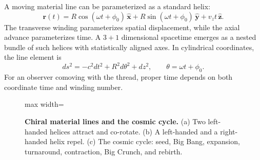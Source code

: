 \documentclass[12pt,a4paper]{article}
\begin{document}
A moving material line can be parameterized as a standard helix:
\begin{equation}
    \mathbf{r}(t) = R\cos(\omega t+\phi_0)\,\hat{\mathbf{x}}
    + R\sin(\omega t+\phi_0)\,\hat{\mathbf{y}}
    + v_z t\,\hat{\mathbf{z}}.
    \label{eq:helix}
\end{equation}
The transverse winding parameterizes spatial displacement, while the axial advance parameterizes time. A $3+1$ dimensional spacetime emerges as a nested bundle of such helices with statistically aligned axes. In cylindrical coordinates, the line element is
\begin{equation}
    ds^2 = -c^2dt^2 + R^2d\theta^2 + dz^2,\qquad \theta=\omega t+\phi_0.
\end{equation}
For an observer comoving with the thread, proper time depends on both coordinate time and winding number.

\begin{figure}[htbp]
\centering
\begin{adjustbox}{max width=\textwidth}
\end{adjustbox}
\caption{\textbf{Chiral material lines and the cosmic cycle.}
(a) Two left-handed helices attract and co-rotate.
(b) A left-handed and a right-handed helix repel.
(c) The cosmic cycle: seed, Big Bang, expansion, turnaround, contraction, Big Crunch, and rebirth.}
\label{fig:1}
\end{figure}
\end{document}
